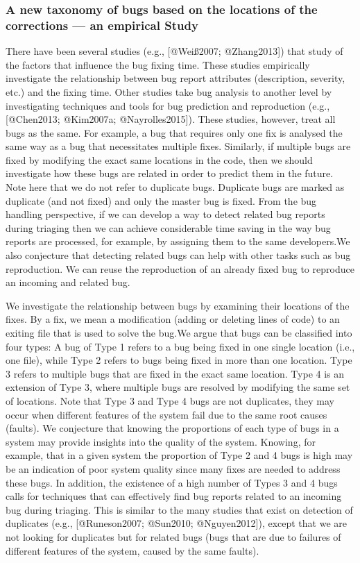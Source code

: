 \subsubsection{A new taxonomy of bugs based on the locations of the
corrections --- an empirical
Study}\label{a-new-taxonomy-of-bugs-based-on-the-locations-of-the-corrections-an-empirical-study}

There have been several studies (e.g., {[}@Weiß2007; @Zhang2013{]}) that
study of the factors that influence the bug fixing time. These studies
empirically investigate the relationship between bug report attributes
(description, severity, etc.) and the fixing time. Other studies take
bug analysis to another level by investigating techniques and tools for
bug prediction and reproduction (e.g., {[}@Chen2013; @Kim2007a;
@Nayrolles2015{]}). These studies, however, treat all bugs as the same.
For example, a bug that requires only one fix is analysed the same way
as a bug that necessitates multiple fixes. Similarly, if multiple bugs
are fixed by modifying the exact same locations in the code, then we
should investigate how these bugs are related in order to predict them
in the future. Note here that we do not refer to duplicate bugs.
Duplicate bugs are marked as duplicate (and not fixed) and only the
master bug is fixed. From the bug handling perspective, if we can
develop a way to detect related bug reports during triaging then we can
achieve considerable time saving in the way bug reports are processed,
for example, by assigning them to the same developers.We also conjecture
that detecting related bugs can help with other tasks such as bug
reproduction. We can reuse the reproduction of an already fixed bug to
reproduce an incoming and related bug.

We investigate the relationship between bugs by examining their
locations of the fixes. By a fix, we mean a modification (adding or
deleting lines of code) to an exiting file that is used to solve the
bug.We argue that bugs can be classified into four types: A bug of Type
1 refers to a bug being fixed in one single location (i.e., one file),
while Type 2 refers to bugs being fixed in more than one location. Type
3 refers to multiple bugs that are fixed in the exact same location.
Type 4 is an extension of Type 3, where multiple bugs are resolved by
modifying the same set of locations. Note that Type 3 and Type 4 bugs
are not duplicates, they may occur when different features of the system
fail due to the same root causes (faults). We conjecture that knowing
the proportions of each type of bugs in a system may provide insights
into the quality of the system. Knowing, for example, that in a given
system the proportion of Type 2 and 4 bugs is high may be an indication
of poor system quality since many fixes are needed to address these
bugs. In addition, the existence of a high number of Types 3 and 4 bugs
calls for techniques that can effectively find bug reports related to an
incoming bug during triaging. This is similar to the many studies that
exist on detection of duplicates (e.g., {[}@Runeson2007; @Sun2010;
@Nguyen2012{]}), except that we are not looking for duplicates but for
related bugs (bugs that are due to failures of different features of the
system, caused by the same faults).

